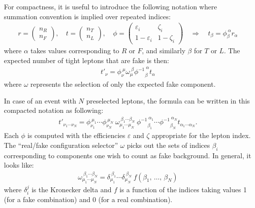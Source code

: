 For compactness, it is useful to introduce the following notation where summation convention is implied over repeated indices:
\begin{align*}
  r = \begin{pmatrix} n_R \\ n_F \end{pmatrix} , \quad
  t = \begin{pmatrix} n_T \\ n_L \end{pmatrix} , \quad
  \phi  = 
  \begin{pmatrix}
    \varepsilon_i & \zeta_i \\
    1-\varepsilon_i & 1-\zeta_i
  \end{pmatrix} 
  \quad\Rightarrow
  \quad
  t_\beta = {\phi}_\beta^{\ \alpha} r_\alpha
\end{align*}
where $\alpha$ takes values corresponding to $R$ or $F$, and similarly $\beta$ for $T$ or $L$. The expected number of tight leptons that are fake is then:
\begin{align*}
  t'_\nu = {\phi}_\nu^{\ \mu} \omega_\mu^{\ \beta} {{\phi}^{-1}}_\beta^{\ \alpha} t_\alpha
\end{align*}
where $\omega$ represents the selection of only the expected fake component. 

In case of an event with $N$ preselected leptons, the formula can be written in this compacted notation as following:
\begin{align*}
  t'_{\nu_1\cdots\nu_N} = \phi_{\nu_1}^{\ \mu_1}\cdots\phi_{\nu_N}^{\ \mu_N}\ \omega_{\mu_1\cdots\mu_N}^{\ \beta_1\cdots\beta_N}\ {\phi^{-1}}_{\beta_1}^{\ \alpha_1}\cdots{\phi^{-1}}_{\beta_N}^{\ \alpha_N} t_{\alpha_1\cdots\alpha_N}.
\end{align*}
Each $\phi$ is computed with the efficiencies $\varepsilon$ and $\zeta$ appropriate for the lepton index. The ``real/fake configuration selector'' $\omega$ picks out the sets of indices ${\beta_i}$ corresponding to components one wish to count as fake background. In general, it looks like:
\begin{align*}
  \omega_{\mu_1\cdots\mu_N}^{\ \beta_1\cdots\beta_N} = \delta_{\mu_1}^{\ \beta_1}\cdots\delta_{\mu_N}^{\ \beta_N} \ f(\beta_1,\,\ldots,\,\beta_N)
\end{align*}
where $\delta_i^j$ is the Kronecker delta and $f$ is a function of the indices taking values 1 (for a fake combination) and 0 (for a real combination).

